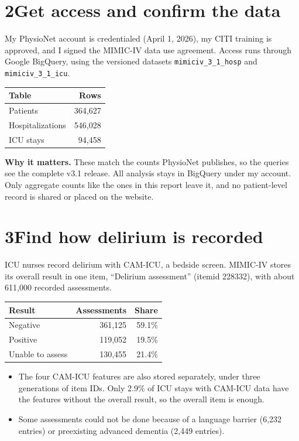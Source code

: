 \documentclass[11pt]{article}
\newcommand{\why}[1]{\begin{whynote}\textbf{\color{accent}Why it matters.} #1\end{whynote}}
\newcommand{\step}[2]{\section*{\color{accent}#1\quad\color{black}#2}}
\begin{document}
\step{2}{Get access and confirm the data}

My PhysioNet account is credentialed (April 1, 2026), my CITI training is approved, and I signed the MIMIC-IV data use agreement. Access runs through Google BigQuery, using the versioned datasets \texttt{mimiciv\_3\_1\_hosp} and \texttt{mimiciv\_3\_1\_icu}.

\begin{center}
\begin{tabular}{l r}
	\toprule
	Table & Rows \\
	\midrule
	Patients & 364,627 \\
	Hospitalizations & 546,028 \\
	ICU stays & 94,458 \\
	\bottomrule
\end{tabular}
\end{center}

\why{These match the counts PhysioNet publishes, so the queries see the complete v3.1 release. All analysis stays in BigQuery under my account. Only aggregate counts like the ones in this report leave it, and no patient-level record is shared or placed on the website.}

\step{3}{Find how delirium is recorded}

ICU nurses record delirium with CAM-ICU, a bedside screen. MIMIC-IV stores its overall result in one item, ``Delirium assessment'' (itemid 228332), with about 611,000 recorded assessments.

\begin{center}
\begin{tabular}{l r r}
	\toprule
	Result & Assessments & Share \\
	\midrule
	Negative & 361,125 & 59.1\% \\
	Positive & 119,052 & 19.5\% \\
	Unable to assess & 130,455 & 21.4\% \\
	\bottomrule
\end{tabular}
\end{center}

\begin{itemize}
	\item The four CAM-ICU features are also stored separately, under three generations of item IDs. Only 2.9\% of ICU stays with CAM-ICU data have the features without the overall result, so the overall item is enough.
	\item Some assessments could not be done because of a language barrier (6,232 entries) or preexisting advanced dementia (2,449 entries).
\end{itemize}
\end{document}

